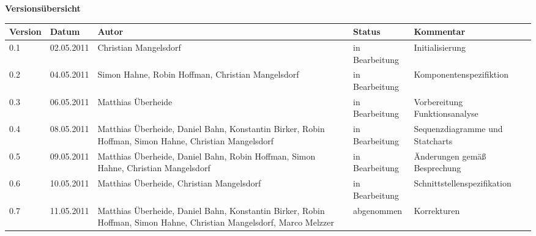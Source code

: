 

{\textbf{Versionsübersicht}}\\[2ex]

\begin{longtable}{|m{1.78cm}|m{1.59cm}|m{2.86cm}|m{1.9cm}|m{5.25cm}|}

  \hline                                              %

  \textbf{Version}  &    \textbf{Datum}  &    \textbf{Autor}  &
  \textbf{Status}   &    \textbf{Kommentar}       \\  %
  \hline                                              %

  0.1&02.05.2011&Christian Mangelsdorf&in Bearbeitung&Initialisierung\\
  \hline
  0.2&04.05.2011&Simon Hahne, Robin Hoffman, Christian Mangelsdorf&in Bearbeitung&Komponentenspezifiktion\\
  \hline
  0.3&06.05.2011&Matthias Überheide&in Bearbeitung&Vorbereitung Funktionsanalyse\\
  \hline
  0.4&08.05.2011&Matthias Überheide, Daniel Bahn, Konstantin Birker, Robin Hoffman, Simon Hahne, Christian Mangelsdorf&in Bearbeitung&Sequenzdiagramme und Statcharts\\
  \hline
  0.5&09.05.2011&Matthias Überheide, Daniel Bahn, Robin Hoffman, Simon Hahne, Christian Mangelsdorf&in Bearbeitung&Änderungen gemäß Besprechung\\
  \hline
  0.6&10.05.2011&Matthias Überheide, Christian Mangelsdorf&in Bearbeitung&Schnittstellenspezifikation\\
  \hline
  0.7&11.05.2011&Matthias Überheide, Daniel Bahn, Konstantin Birker, Robin Hoffman, Simon Hahne, Christian Mangelsdorf, Marco Melzzer&abgenommen&Korrekturen\\
  \hline
  \hline                                              %

\end{longtable}

